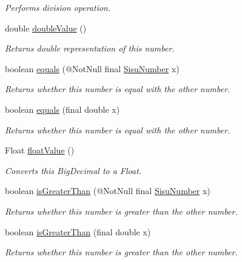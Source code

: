\begin{DoxyCompactItemize}
\begin{DoxyCompactList}\small\item\em Performs division operation. \end{DoxyCompactList}\item 
double \hyperlink{classcom_1_1aarrelaakso_1_1drawl_1_1_sisu_number_a2ec0d89a34f60f2283ea189a1ae951c1}{double\+Value} ()
\begin{DoxyCompactList}\small\item\em Returns double representation of this number. \end{DoxyCompactList}\item 
boolean \hyperlink{classcom_1_1aarrelaakso_1_1drawl_1_1_sisu_number_a9e6fe0faefc1721b27b4c53f5d8d93ea}{equals} (@Not\+Null final \hyperlink{classcom_1_1aarrelaakso_1_1drawl_1_1_sisu_number}{Sisu\+Number} x)
\begin{DoxyCompactList}\small\item\em Returns whether this number is equal with the other number. \end{DoxyCompactList}\item 
boolean \hyperlink{classcom_1_1aarrelaakso_1_1drawl_1_1_sisu_number_afb83c3ee221f4b839bae842d39ae9067}{equals} (final double x)
\begin{DoxyCompactList}\small\item\em Returns whether this number is equal with the other number. \end{DoxyCompactList}\item 
Float \hyperlink{classcom_1_1aarrelaakso_1_1drawl_1_1_sisu_number_a4c7db66d6d3016a3d10a1664b43117b9}{float\+Value} ()
\begin{DoxyCompactList}\small\item\em Converts this Big\+Decimal to a Float. \end{DoxyCompactList}\item 
boolean \hyperlink{classcom_1_1aarrelaakso_1_1drawl_1_1_sisu_number_a453cb4d7609c2ea7aa0360477e88b6c4}{is\+Greater\+Than} (@Not\+Null final \hyperlink{classcom_1_1aarrelaakso_1_1drawl_1_1_sisu_number}{Sisu\+Number} x)
\begin{DoxyCompactList}\small\item\em Returns whether this number is greater than the other number. \end{DoxyCompactList}\item 
boolean \hyperlink{classcom_1_1aarrelaakso_1_1drawl_1_1_sisu_number_a3910d3f0a3a3de0eea7261eed941742b}{is\+Greater\+Than} (final double x)
\begin{DoxyCompactList}\small\item\em Returns whether this number is greater than the other number. \end{DoxyCompactList}\item 

\end{DoxyCompactItemize}
